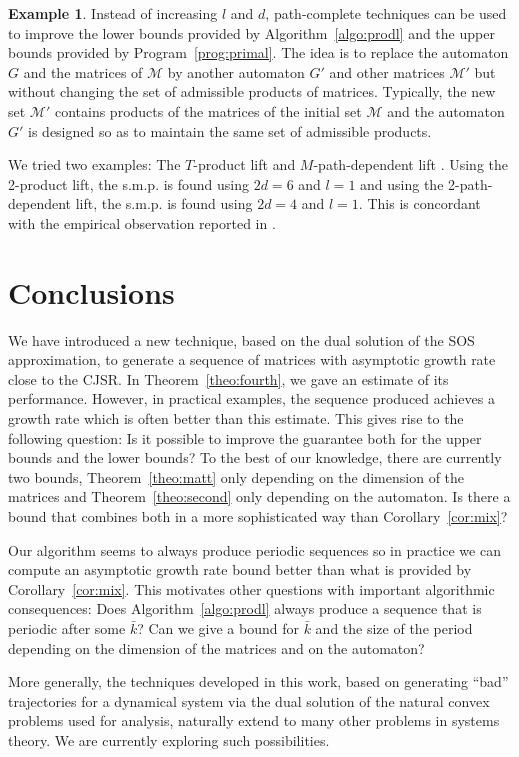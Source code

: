 \documentclass{sig-alternate-05-2015}
\newcommand{\1}{\mathbf{1}}
\theoremstyle{definition}
\newtheorem{myexem}{Example}
\newcommand{\A}{\mathcal{M}}
\newcommand{\G}{G}
\begin{document}
\begin{myexem}
  Instead of increasing $l$ and $d$, path-complete techniques
  \cite{ahmadi2014joint} can be used to improve the lower bounds
  provided by Algorithm~\ref{algo:prodl} and the upper bounds provided
  by Program~\ref{prog:primal}.  The idea is to replace the automaton
  $\G$ and the matrices of $\A$ by another automaton $\G'$ and other
  matrices $\A'$ but without changing the set of admissible products
  of matrices.  Typically, the new set $\A'$ contains products of the
  matrices of the initial set $\A$ and the automaton $\G'$ is designed
  so as to maintain the same set of admissible products.

  We tried two examples: The $T$-product lift
  \cite{philippe2015stability} and $M$-path-dependent lift
  \cite{lee2006uniform}.  Using the 2-product lift, the s.m.p. is
  found using $2d = 6$ and $l = 1$ and using the 2-path-dependent
  lift, the s.m.p. is found using $2d = 4$ and $l = 1$.
  This is concordant with the empirical observation reported in
  \cite{philippe2015stability}.
\end{myexem}


\section{Conclusions}

We have introduced a new technique, based on the dual solution of the
SOS approximation, to generate a sequence of matrices with asymptotic
growth rate close to the CJSR. In Theorem~\ref{theo:fourth}, we gave
an estimate of its performance. However, in practical examples, the
sequence produced achieves a growth rate which is often better than
this estimate.  This gives rise to the following question: Is it
possible to improve the guarantee both for the upper bounds and the
lower bounds?  To the best of our knowledge, there are currently two
bounds, Theorem~\ref{theo:matt} only depending on the dimension of the
matrices and Theorem~\ref{theo:second} only depending on the automaton.
Is there a bound that combines both in a more sophisticated way than
Corollary~\ref{cor:mix}?

Our algorithm seems to always produce periodic sequences so in
practice we can compute an asymptotic growth rate bound better than
what is provided by Corollary~\ref{cor:mix}.  This motivates other
questions with important algorithmic consequences: Does
Algorithm~\ref{algo:prodl} always produce a sequence that is periodic
after some $\bar{k}$?  Can we give a bound for $\bar{k}$ and the size
of the period depending on the dimension of the matrices and on the
automaton?

More generally, the techniques developed in this work, based on
generating ``bad'' trajectories for a dynamical system via the dual
solution of the natural convex problems used for analysis, naturally
extend to many other problems in systems theory. We are currently
exploring such possibilities.





\end{document}
